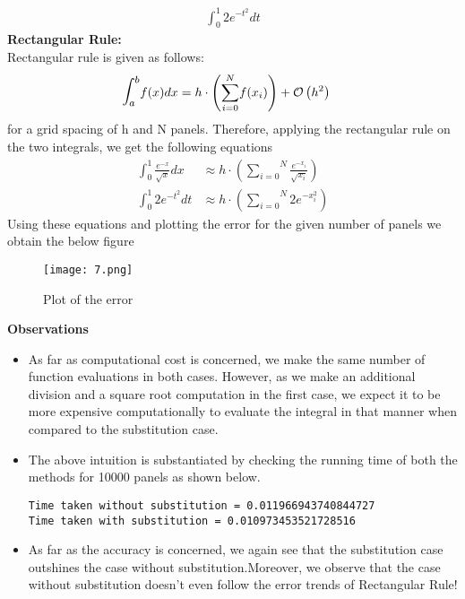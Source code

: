 \documentclass[letterpaper]{exam}
\begin{document}
\begin{questions}
\begin{solution}
\begin{align*}
    \int_{0}^{1} 2e^{-t^2} dt
\end{align*}
\textbf{Rectangular Rule:}\\
Rectangular rule is given as follows:
\begin{align}
    \mathlarger{\mathlarger{\int}}_a^b f(x) dx &= h \cdot \left(\overset{N}{\underset{i=0}{\sum}} f(x_i)\right) + \mathcal{O}\left(h^2\right)
 \end{align}
 for a grid spacing of h and N panels.
 Therefore, applying the rectangular rule on the two integrals, we get the following equations
 \begin{align*}
     \int_{0}^{1} \frac{e^{-x}}{\sqrt{x}} dx &\approx h \cdot \left(\overset{N}{\underset{i=0}{\sum}} \frac{e^{-x_i}}{\sqrt{x_i}}\right)\\
     \int_{0}^{1} 2e^{-t^2} dt &\approx  h \cdot \left(\overset{N}{\underset{i=0}{\sum}} 2e^{-x_i^2} \right)
 \end{align*}
 Using these equations and plotting the error for the given number of panels we obtain the below figure
 \begin{figure}[H]  
     \centering
    \texttt{[image: 7.png]}
     \label{fig:Dendrogram for the problem 3(c)}
     \caption{Plot of the error}
\end{figure}
\textbf{Observations}
\begin{itemize}
    \item As far as computational cost is concerned, we make the same number of function evaluations in both cases. However, as we make an additional division and a square root computation in the first case, we expect it to be more expensive computationally to evaluate the integral in that manner when compared to the substitution case.
    \item The above intuition is substantiated by checking the running time of both the methods for 10000 panels as shown below.
    \begin{verbatim}
Time taken without substitution = 0.011966943740844727
Time taken with substitution = 0.010973453521728516
    \end{verbatim}
    \item As far as the accuracy is concerned, we again see that the substitution case outshines the case without substitution.Moreover, we observe that the case without substitution doesn't even follow the error trends of Rectangular Rule!

\end{itemize}
\end{solution}
\end{questions}
\end{document}
